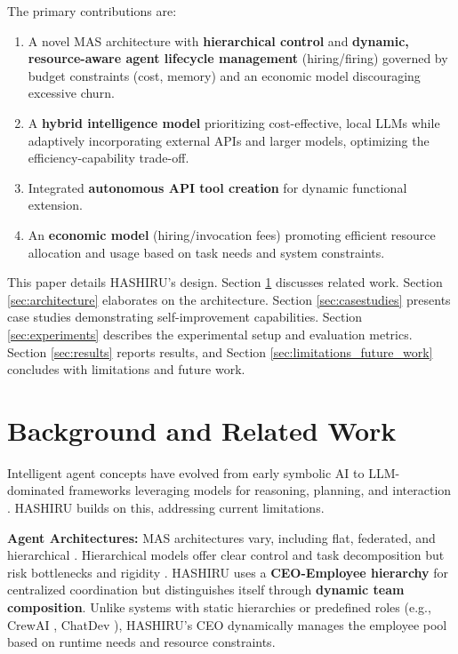 \documentclass[conference]{IEEEtran}
\begin{document}
The primary contributions are:
\begin{enumerate}
    \item A novel MAS architecture with \textbf{hierarchical control} and \textbf{dynamic, resource-aware agent lifecycle management} (hiring/firing) governed by budget constraints (cost, memory) and an economic model discouraging excessive churn.
    \item A \textbf{hybrid intelligence model} prioritizing cost-effective, local LLMs while adaptively incorporating external APIs and larger models, optimizing the efficiency-capability trade-off.
    \item Integrated \textbf{autonomous API tool creation} for dynamic functional extension.
    \item An \textbf{economic model} (hiring/invocation fees) promoting efficient resource allocation and usage based on task needs and system constraints.
\end{enumerate}

This paper details HASHIRU's design. Section \ref{sec:background} discusses related work. Section \ref{sec:architecture} elaborates on the architecture. Section \ref{sec:casestudies} presents case studies demonstrating self-improvement capabilities. Section \ref{sec:experiments} describes the experimental setup and evaluation metrics. Section \ref{sec:results} reports results, and Section \ref{sec:limitations_future_work} concludes with limitations and future work.

\section{Background and Related Work} \label{sec:background}

Intelligent agent concepts have evolved from early symbolic AI \cite{russell2010artificial, shoham1994agent} to LLM-dominated frameworks leveraging models for reasoning, planning, and interaction \cite{wang2023survey, xi2023rise}. HASHIRU builds on this, addressing current limitations.

\textbf{Agent Architectures:}
MAS architectures vary, including flat, federated, and hierarchical \cite{dorri2018multi, horling2004survey}. Hierarchical models offer clear control and task decomposition but risk bottlenecks and rigidity \cite{gaston2005agenta,gaston2005agentb}. HASHIRU uses a \textbf{CEO-Employee hierarchy} for centralized coordination but distinguishes itself through \textbf{dynamic team composition}. Unlike systems with static hierarchies or predefined roles (e.g., CrewAI \cite{crewai}, ChatDev \cite{qian2023communicative}), HASHIRU's CEO dynamically manages the employee pool based on runtime needs and resource constraints.
\end{document}
